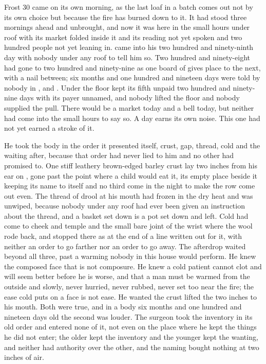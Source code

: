 
Frost 30 came on its own morning, as the last loaf in a batch comes out not by its own choice but because the fire has burned down to it. It had stood three mornings ahead and unbrought, and now it was here in the small hours under  roof with its market folded inside it and its reading not yet spoken and two hundred people not yet leaning in.  came into his two hundred and ninety-ninth day with nobody under any roof to tell him so. Two hundred and ninety-eight had gone to two hundred and ninety-nine as one board of  gives place to the next, with a nail between; six months and one hundred and nineteen days were told by nobody in ,  and . Under the floor  kept its fifth unpaid two hundred and ninety-nine days with its payer unnamed, and nobody lifted the floor and nobody supplied the pull. There would be a market today and a bell today, but neither had come into the small hours to say so. A day earns its own noise. This one had not yet earned a stroke of it.

He took the body in the order it presented itself, crust, gap, thread, cold and the waiting after, because that order had never lied to him and no other had promised to. One stiff leathery brown-edged barley crust lay two inches from his ear on , gone past the point where a child would eat it, its empty place beside it keeping its name to itself and no third come in the night to make the row come out even. The thread of drool at his mouth had frozen in the dry heat and was unwiped, because nobody under any roof had ever been given an instruction about the thread, and a basket set down is a pot set down and left. Cold had come to cheek and temple and the small bare joint of the wrist where the wool rode back, and stopped there as at the end of a line written out for it, with neither an order to go farther nor an order to go away. The afterdrop waited beyond all three, past a warming nobody in this house would perform. He knew the composed face that is not composure. He knew a cold patient cannot clot and will seem better before he is worse, and that a man must be warmed from the outside and slowly, never hurried, never rubbed, never set too near the fire; the ease cold puts on a face is not ease. He wanted the crust lifted the two inches to his mouth. Both were true, and in a body six months and one hundred and nineteen days old the second was louder. The surgeon took the inventory in its old order and entered none of it, not even on the place where he kept the things he did not enter; the older kept the inventory and the younger kept the wanting, and neither had authority over the other, and the naming bought nothing at two inches of air.

